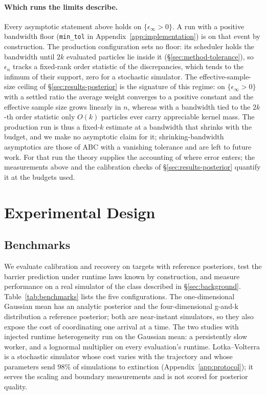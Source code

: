 \documentclass[10pt]{article}
\theoremstyle{plain}
\theoremstyle{definition}
\begin{document}
\paragraph{Which runs the limits describe.} Every asymptotic statement above holds on $\{\epsilon_\infty>0\}$. A run with a positive bandwidth floor (\texttt{min\_tol} in Appendix~\ref{app:implementation}) is on that event by construction. The production configuration sets no floor: its scheduler holds the bandwidth until $2k$ evaluated particles lie inside it (\S\ref{sec:method-tolerance}), so $\epsilon_n$ tracks a fixed-rank order statistic of the discrepancies, which tends to the infimum of their support, zero for a stochastic simulator. The effective-sample-size ceiling of \S\ref{sec:results-posterior} is the signature of this regime: on $\{\epsilon_\infty>0\}$ with a settled ratio the average weight converges to a positive constant and the effective sample size grows linearly in $n$, whereas with a bandwidth tied to the $2k$-th order statistic only $O(k)$ particles ever carry appreciable kernel mass. The production run is thus a fixed-$k$ estimate at a bandwidth that shrinks with the budget, and we make no asymptotic claim for it; shrinking-bandwidth asymptotics are those of ABC with a vanishing tolerance and are left to future work. For that run the theory supplies the accounting of where error enters; the measurements above and the calibration checks of \S\ref{sec:results-posterior} quantify it at the budgets used.

\section{Experimental Design}\label{sec:experiments}

\subsection{Benchmarks}\label{sec:experiments-suite}
We evaluate calibration and recovery on targets with reference posteriors, test the barrier prediction under runtime laws known by construction, and measure performance on a real simulator of the class described in \S\ref{sec:background}. Table~\ref{tab:benchmarks} lists the five configurations. The one-dimensional Gaussian mean has an analytic posterior and the four-dimensional g-and-k distribution \citep{rayner2002gk} a reference posterior; both are near-instant simulators, so they also expose the cost of coordinating one arrival at a time. The two studies with injected runtime heterogeneity run on the Gaussian mean: a persistently slow worker, and a lognormal multiplier on every evaluation's runtime. Lotka--Volterra is a stochastic simulator whose cost varies with the trajectory and whose parameters send $98\%$ of simulations to extinction (Appendix~\ref{app:protocol}); it serves the scaling and boundary measurements and is not scored for posterior quality.
\end{document}
